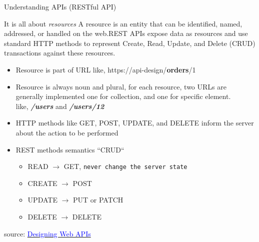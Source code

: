 \documentclass{beamer}
\begin{document}
\begin{frame}[t]{Understanding APIs \small (RESTful API)}
	
	\scriptsize 
	\begin{block}{It is all about \textit{resources}}
		A resource is an entity that can be identified, named, addressed, or handled on the web.REST APIs expose data as resources
		and use standard HTTP methods to represent Create, Read, Update, and Delete (CRUD) transactions against these resources.
	\end{block}  
  
  \scriptsize 
   \begin{itemize}
    \scriptsize 
   	\item<2-> Resource is part of URL like, https://api-design/\textbf{orders}/1
   	\item<3-> Resource is always noun and plural, for each resource, two URLs are generally implemented one for collection, 
   	and one for specific element.\\ like, \textit{\textbf{/users}} and \textit{\textbf{/users/12}}
   	\item<4-> HTTP methods like GET, POST, UPDATE, and DELETE inform the server about the action to be performed
   	\item<5-> REST methods semantics ``CRUD``
   		\begin{itemize}
   			\scriptsize 
  			\item READ   \hspace{0.53cm} $\rightarrow$ GET, \texttt{never change the server state}
   			\item CREATE \hspace{0.2cm}  $\rightarrow$ POST
   			\item UPDATE \hspace{0.15cm} $\rightarrow$ PUT or PATCH
   			\item DELETE \hspace{0.18cm} $\rightarrow$ DELETE
   		\end{itemize}
   \end{itemize}	   
  
  \vspace{2mm}
  \scriptsize { source: \href{https://www.oreilly.com/library/view/designing-web-apis/9781492026914/}
  		{\textcolor{blue}{Designing Web APIs}}}
  
\end{frame}
\end{document}
